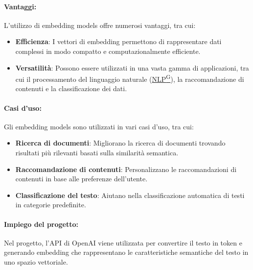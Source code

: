 \paragraph{Vantaggi:}
L'utilizzo di embedding models offre numerosi vantaggi, tra cui:
\begin{itemize}
    \item \textbf{Efficienza}: I vettori di embedding permettono di rappresentare dati complessi in modo compatto e computazionalmente efficiente.
    \item \textbf{Versatilità}: Possono essere utilizzati in una vasta gamma di applicazioni, tra cui il processamento del linguaggio naturale (\href{https://code7crusaders.github.io/docs/\href{https://code7crusaders.github.io/docs/PB/documentazione_interna/glossario.html#pb-product-baseline}{PB\textsuperscript{G}}/documentazione_interna/glossario.html#natural-language-processing-nlp}{NLP\textsuperscript{G}}), la raccomandazione di contenuti e la classificazione dei dati.
\end{itemize}
\paragraph{Casi d'uso:}
Gli embedding models sono utilizzati in vari casi d'uso, tra cui:
\begin{itemize}
    \item \textbf{Ricerca di documenti}: Migliorano la ricerca di documenti trovando risultati più rilevanti basati sulla similarità semantica.
    \item \textbf{Raccomandazione di contenuti}: Personalizzano le raccomandazioni di contenuti in base alle preferenze dell'utente.
    \item \textbf{Classificazione del testo}: Aiutano nella classificazione automatica di testi in categorie predefinite.
\end{itemize}



\paragraph{Impiego del progetto:}
Nel progetto, l'API di OpenAI viene utilizzata per convertire il testo in token e generando embedding che rappresentano le caratteristiche semantiche del testo in uno spazio vettoriale.



